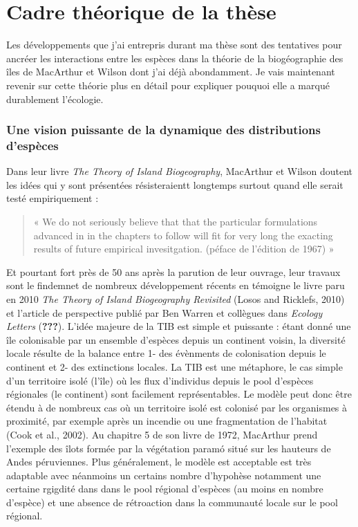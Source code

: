 \section*{Cadre théorique de la
thèse}\label{cadre-thuxe9orique-de-la-thuxe8se}

Les développements que j'ai entrepris durant ma thèse sont des
tentatives pour ancréer les interactions entre les espèces dans la
théorie de la biogéographie des îles de MacArthur et Wilson dont j'ai
déjà abondamment. Je vais maintenant revenir sur cette théorie plus en
détail pour expliquer pouquoi elle a marqué durablement l'écologie.

\subsubsection*{Une vision puissante de la dynamique des distributions
d'espèces}\label{une-vision-puissante-de-la-dynamique-des-distributions-despuxe8ces}

Dans leur livre \emph{The Theory of Island Biogeography}, MacArthur et
Wilson doutent les idées qui y sont présentées résisteraientt longtemps
surtout quand elle serait testé empiriquement :

\begin{quote}
« We do not seriously believe that that the particular formulations
advanced in in the chapters to follow will fit for very long the
exacting results of future empirical invesitgation. (péface de l'édition
de 1967) »
\end{quote}

Et pourtant fort près de 50 ans après la parution de leur ouvrage, leur
travaux sont le findemnet de nombreux développement récents en témoigne
le livre paru en 2010 \emph{The Theory of Island Biogeography Revisited}
(Losos and Ricklefs, 2010) et l'article de perspective publié par Ben
Warren et collègues dans \emph{Ecology Letters} ({\textbf{???}}). L'idée
majeure de la TIB est simple et puissante : étant donné une île
colonisable par un ensemble d'espèces depuis un continent voisin, la
diversité locale résulte de la balance entre 1- des évènments de
colonisation depuis le continent et 2- des extinctions locales. La TIB
est une métaphore, le cas simple d'un territoire isolé (l'île) où les
flux d'individus depuis le pool d'espèces régionales (le continent) sont
facilement représentables. Le modèle peut donc être étendu à de nombreux
cas où un territoire isolé est colonisé par les organismes à proximité,
par exemple après un incendie ou une fragmentation de l'habitat (Cook et
al., 2002). Au chapitre 5 de son livre de 1972, MacArthur prend
l'exemple des îlots formée par la végétation paramó situé sur les
hauteurs de Andes péruviennes. Plus généralement, le modèle est
acceptable est très adaptable avec néanmoins un certains nombre
d'hypohèse notamment une certaine rgigdité dans dans le pool régional
d'espèces (au moins en nombre d'espèce) et une absence de rétroaction
dans la communauté locale sur le pool régional.

